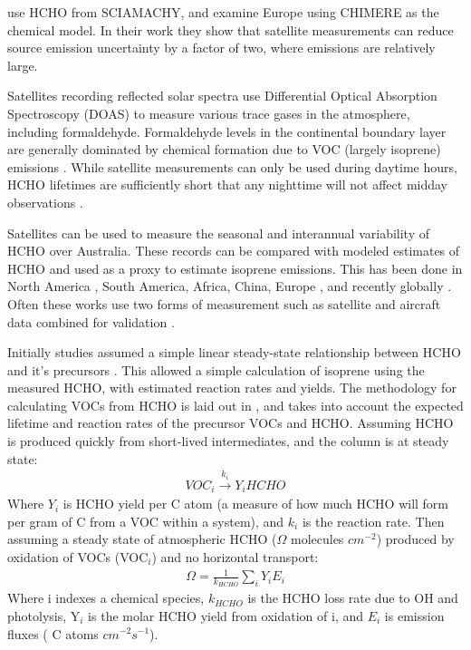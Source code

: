     \citet{Dufour2009} use HCHO from SCIAMACHY, and examine Europe using CHIMERE as the chemical model. 
    In their work they show that satellite measurements can reduce source emission uncertainty by a factor of two, where emissions are relatively large.
    
    Satellites recording reflected solar spectra use Differential Optical Absorption Spectroscopy (DOAS) to measure various trace gases in the atmosphere, including formaldehyde. 
    Formaldehyde levels in the continental boundary layer are generally dominated by chemical formation due to VOC (largely isoprene) emissions \citep{Kefauver2014}.
    While satellite measurements can only be used during daytime hours, HCHO lifetimes are sufficiently short that any nighttime will not affect midday observations \citep{Wolfe2016}.
    
    Satellites can be used to measure the seasonal and interannual variability of HCHO over Australia.
    These records can be compared with modeled estimates of HCHO and used as a proxy to estimate isoprene emissions.
    This has been done in North America \citep{Palmer2003, Millet2006}, South America, Africa, China, Europe \citep{Dufour2009}, and recently globally \citep{FortemsCheiney2012, Bauwens2016}.
    Often these works use two forms of measurement such as satellite and aircraft data combined for validation \citep{Marais2014}.
    
    Initially studies assumed a simple linear steady-state relationship between HCHO and it's precursors \citep{Palmer2003, Palmer2006, Millet2006}.
    This allowed a simple calculation of isoprene using the measured HCHO, with estimated reaction rates and yields.
    The methodology for calculating VOCs from HCHO is laid out in \citet{Palmer2003}, and takes into account the expected lifetime and reaction rates of the precursor VOCs and HCHO.
    Assuming HCHO is produced quickly from short-lived intermediates, and the column is at steady state:
    \begin{eqnarray*}
    VOC_i \overset{k_i}{\rightarrow} Y_i HCHO
    \end{eqnarray*}
    Where $Y_i$ is HCHO yield per C atom (a measure of how much HCHO will form per gram of C from a VOC within a system), and $k_i$ is the reaction rate.
    Then assuming a steady state of atmospheric HCHO ($\Omega$ molecules $cm^{-2}$) produced by oxidation of VOCs (VOC$_i$) and no horizontal transport:
    \begin{eqnarray*}
    \Omega = \frac{1}{k_{HCHO}} \sum_{i} Y_i E_i
    \end{eqnarray*}
    Where i indexes a chemical species, $k_{HCHO}$ is the HCHO loss rate due to OH and photolysis, Y$_i$ is the molar HCHO yield from oxidation of i, and $E_i$ is emission fluxes ( C atoms $cm^{-2}s^{-1}$).
    
